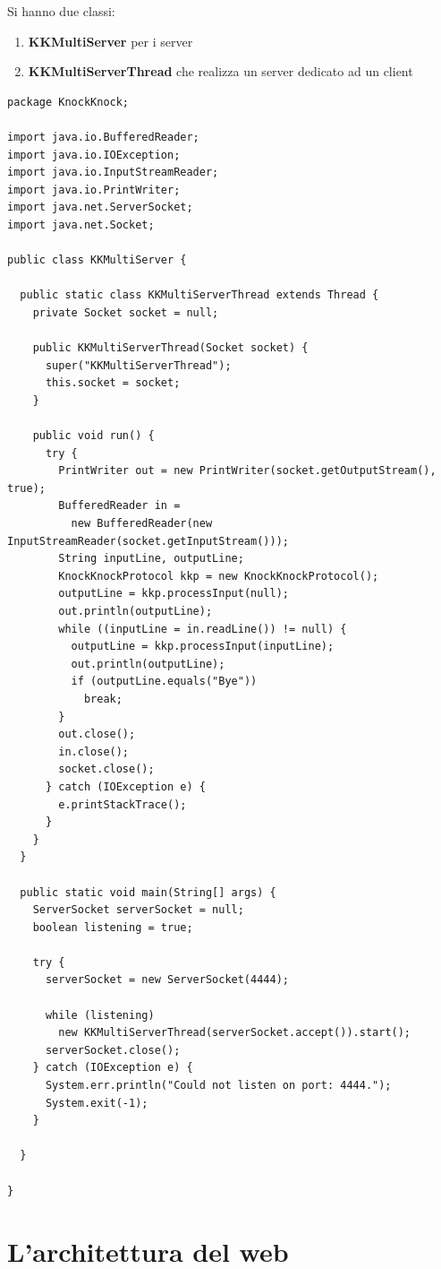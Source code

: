 \documentclass[a4paper,12pt, oneside]{book}
\begin{document}
Si hanno due classi:
\begin{enumerate}
	\item \textbf{KKMultiServer} per i server
	\item \textbf{KKMultiServerThread} che realizza un server dedicato ad un client
\end{enumerate}
\begin{verbatim}
package KnockKnock;

import java.io.BufferedReader;
import java.io.IOException;
import java.io.InputStreamReader;
import java.io.PrintWriter;
import java.net.ServerSocket;
import java.net.Socket;

public class KKMultiServer {

  public static class KKMultiServerThread extends Thread {
    private Socket socket = null;

    public KKMultiServerThread(Socket socket) {
      super("KKMultiServerThread");
      this.socket = socket;
    }

    public void run() {
      try {
        PrintWriter out = new PrintWriter(socket.getOutputStream(), true);
        BufferedReader in = 
          new BufferedReader(new InputStreamReader(socket.getInputStream()));
        String inputLine, outputLine;
        KnockKnockProtocol kkp = new KnockKnockProtocol();
        outputLine = kkp.processInput(null);
        out.println(outputLine);
        while ((inputLine = in.readLine()) != null) {
          outputLine = kkp.processInput(inputLine);
          out.println(outputLine);
          if (outputLine.equals("Bye"))
            break;
        }
        out.close();
        in.close();
        socket.close();
      } catch (IOException e) {
        e.printStackTrace();
      }
    }
  }

  public static void main(String[] args) {
    ServerSocket serverSocket = null;
    boolean listening = true;

    try {
      serverSocket = new ServerSocket(4444);

      while (listening)
        new KKMultiServerThread(serverSocket.accept()).start();
      serverSocket.close();
    } catch (IOException e) {
      System.err.println("Could not listen on port: 4444.");
      System.exit(-1);
    }

  }

}

\end{verbatim}

\section{L'architettura del web}
\end{document}
